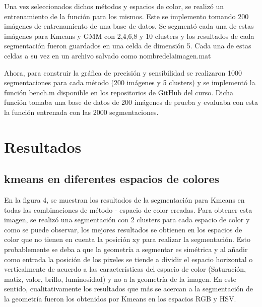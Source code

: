 \documentclass[10pt,twocolumn,letterpaper]{article}
\begin{document}
Una vez seleccionados dichos métodos y espacios de color, se realizó un entrenamiento de la función para los mismos. Este se implemento tomando 200 imágenes de entrenamiento de una base de datos. Se segmentó cada una de estas imágenes para Kmeans y GMM con 2,4,6,8 y 10 clusters y los resultados de cada segmentación fueron guardados en una celda de dimensión 5. Cada una de estas celdas a su vez en un archivo salvado como nombredelaimagen.mat

Ahora, para construir la gráfica de precisión y sensibilidad  se realizaron 1000 segmentaciones para cada método (200 imágenes y 5 clusters) y se implementó la función bench.m disponible en los repositorios de GitHub del curso. Dicha función tomaba una base de datos de 200 imágenes de prueba y evaluaba con esta la función entrenada con las 2000 segmentaciones. 

\section{Resultados}

\subsection{kmeans en diferentes espacios de colores}

En la figura 4, se muestran los resultados de la segmentación para Kmeans en todas las combinaciones de método - espacio de color creadas. Para obtener esta imagen, se realizó una segmentación con 2 clusters para cada espacio de color y como se puede observar, los mejores resultados se obtienen en los espacios de color que no tienen en cuenta la posición xy para realizar la segmentación. Esto probablemente se deba a que la geometría a segmentar es simétrica y al añadir como entrada la posición de los pixeles se tiende a dividir el espacio horizontal o verticalmente de acuerdo a las características del espacio de color (Saturación, matiz, valor, brillo, luminosidad) y no a la geometría de la imagen. En este sentido, cualitativamente los resultados que más se acercan a la segmentación de la geometría fueron los obtenidos por Kmeans en los espacios RGB y HSV.
\end{document}
